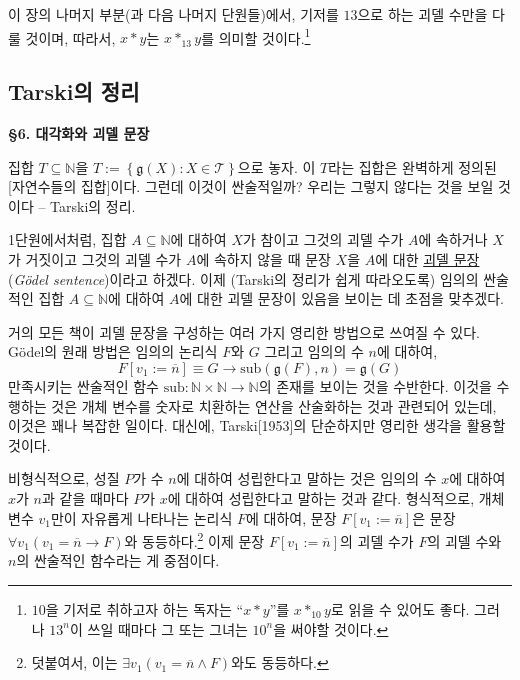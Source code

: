 \documentclass[12pt]{paper}
\newcommand{\gnum}{ \mathfrak{g} }
\begin{document}
  이 장의 나머지 부분(과 다음 나머지 단원들)에서,
  기저를 $13$으로 하는 괴델 수만을 다룰 것이며,
  따라서, $x * y$는 $x *_{13} y$를 의미할 것이다.\footnote
  {
    $10$을 기저로 취하고자 하는 독자는 ``$x * y$''를 $x *_{10} y$로 읽을 수 있어도 좋다.
    그러나 $13^{n}$이 쓰일 때마다 그 또는 그녀는 $10^{n}$을 써야할 것이다.
  }

  \subsection{Tarski의 정리}
  \hspace{12pt}

  \noindent \textbf{\S 6. 대각화와 괴델 문장}

  집합 $T \subseteq \mathbb{N}$을 $T := \left\{ \gnum \left( X \right) : X \in \mathcal{T} \right\}$으로 놓자.
  이 $T$라는 집합은 완벽하게 정의된 [자연수들의 집합]이다.
  그런데 이것이 싼술적일까?
  우리는 그렇지 않다는 것을 보일 것이다 -- Tarski의 정리.

  1단원에서처럼, 집합 $A \subseteq \mathbb{N}$에 대하여
  $X$가 참이고 그것의 괴델 수가 $A$에 속하거나 $X$가 거짓이고 그것의 괴델 수가 $A$에 속하지 않을 때
  문장 $X$을 $A$에 대한 \underline{괴델 문장}(\textit{G\"odel sentence})이라고 하겠다.
  이제 (Tarski의 정리가 쉽게 따라오도록)
  임의의 싼술적인 집합 $A \subseteq \mathbb{N}$에 대하여
  $A$에 대한 괴델 문장이 있음을 보이는 데 초점을 맞추겠다.

  거의 모든 책이 괴델 문장을 구성하는 여러 가지 영리한 방법으로 쓰여질 수 있다.
  G\"odel의 원래 방법은 임의의 논리식 $F$와 $G$ 그리고 임의의 수 $n$에 대하여,
  $$F \left[ v_1 := \overline{n} \right] \equiv G \rightarrow \mathrm{sub} \left( \gnum \left( F \right) , n \right) = \gnum \left( G \right)$$
  만족시키는 싼술적인 함수 $\mathrm{sub} : \mathbb{N} \times \mathbb{N} \to \mathbb{N}$의 존재를 보이는 것을 수반한다.
  이것을 수행하는 것은 개체 변수를 숫자로 치환하는 연산을 산술화하는 것과 관련되어 있는데,
  이것은 꽤나 복잡한 일이다.
  대신에, Tarski[1953]의 단순하지만 영리한 생각을 활용할 것이다.

  비형식적으로, 성질 $P$가 수 $n$에 대하여 성립한다고 말하는 것은
  임의의 수 $x$에 대하여 $x$가 $n$과 같을 때마다 $P$가 $x$에 대하여 성립한다고 말하는 것과 같다.
  형식적으로, 개체 변수 $v_1$만이 자유롭게 나타나는 논리식 $F$에 대하여,
  문장 $F \left[ v_1 := \overline{n} \right]$은 문장 $\forall v_1 \left( v_1 = \overline{n} \rightarrow F \right)$와 동등하다.\footnote
  {
    덧붙여서, 이는 $\exists v_1 \left( v_1 = \overline{n} \land F \right)$와도 동등하다.
  }
  이제 문장 $F \left[ v_1 := \overline{n} \right]$의 괴델 수가 $F$의 괴델 수와 $n$의 싼술적인 함수라는 게 중점이다.
\end{document}
